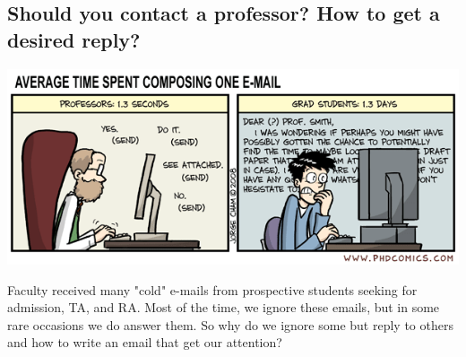 \documentclass[oneside,11pt]{memoir}
\begin{document}


\subsection{Should you contact a professor? How to get a desired reply?}\label{sec:contact}


\begin{center}
  \includegraphics[scale=0.4]{files/emails.png}
\end{center}


Faculty received many "cold" e-mails from prospective students seeking for admission, TA, and RA. Most of the time, we ignore these emails, but in some rare occasions we do answer them. So why do we ignore some but reply to others and how to write an email that get our attention?
\end{document}
